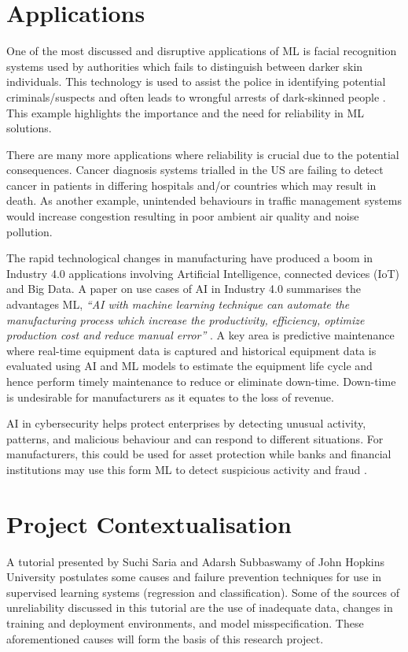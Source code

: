 \documentclass[a4paper,12pt]{report}
\begin{document}
\section{Applications}
One of the most discussed and disruptive applications of ML is facial 
recognition systems used by authorities which fails to distinguish 
between darker skin individuals. This technology is used to assist the 
police in identifying potential criminals/suspects and often leads to 
wrongful arrests of dark-skinned people \cite{Moutafis}. This example highlights the 
importance and the need for reliability in ML solutions. 

There are many more applications where reliability is crucial due to the 
potential consequences. Cancer diagnosis systems trialled in the US are 
failing to detect cancer in patients in differing hospitals and/or countries which may result 
in death. As another example, unintended behaviours in traffic management systems would 
increase congestion resulting in poor ambient air quality and noise 
pollution.

The rapid technological changes in manufacturing have produced a boom 
in Industry 4.0 applications involving Artificial Intelligence, connected
 devices (IoT) and Big Data. A paper on use cases of AI in Industry 4.0 
 summarises the advantages ML, \textit{“AI with machine learning technique can 
 automate the manufacturing process which increase the productivity, 
 efficiency, optimize production cost and reduce manual error” }\cite{9004327}. A 
 key area is predictive maintenance where real-time equipment data is 
 captured and historical equipment data is evaluated using AI and ML 
 models to estimate the equipment life cycle and hence perform timely 
 maintenance to reduce or eliminate down-time. Down-time is undesirable
for manufacturers as it equates to the loss of revenue.

AI in cybersecurity helps protect enterprises by detecting unusual 
activity, patterns, and malicious behaviour and can respond to different 
situations. For manufacturers, this could be used for asset protection 
while banks and financial institutions may use this form ML to detect suspicious 
activity and fraud \cite{9004327}. 

\section{Project Contextualisation}
A tutorial presented by Suchi Saria and Adarsh Subbaswamy of John Hopkins University \cite{saria2019tutorial} postulates some causes and failure prevention techniques for use in supervised learning systems (regression and classification). 
Some of the sources of unreliability discussed in this tutorial are the use of inadequate data, changes in training and deployment environments, and model misspecification. 
These aforementioned causes will form the basis of this research project.
\end{document}

